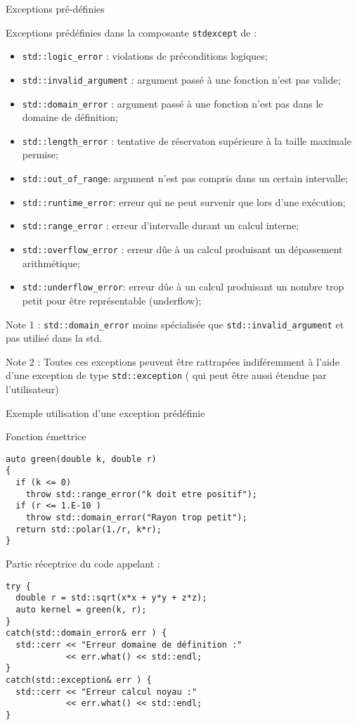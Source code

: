 \documentclass[compress,10pt,aspectratio=169]{beamer}
\begin{document}
\begin{frame}[fragile]{Exceptions pré-définies}
\scriptsize
        
  Exceptions prédéfinies dans la composante \texttt{stdexcept} de  :
  \begin{itemize}
  \item \texttt{std::logic\_error} : violations de préconditions logiques;
  \item \texttt{std::invalid\_argument} : argument passé à une fonction n'est pas valide;
  \item \texttt{std::domain\_error} : argument passé à une fonction n'est pas dans le domaine de définition;
  \item \texttt{std::length\_error} : tentative de réservaton supérieure à la taille maximale permise;
  \item \texttt{std::out\_of\_range}: argument n'est pas compris dans un certain intervalle;
  \item \texttt{std::runtime\_error}: erreur qui ne peut survenir que lors d'une exécution;
  \item \texttt{std::range\_error} : erreur d'intervalle durant un calcul interne;
  \item \texttt{std::overflow\_error} : erreur dûe à un calcul produisant un dépassement arithmétique;
  \item \texttt{std::underflow\_error}: erreur dûe à un calcul produisant un nombre trop petit pour être représentable (underflow);
  \end{itemize}
  \alert{Note 1} : \texttt{std::domain\_error} moins spécialisée que \texttt{std::invalid\_argument} et pas utilisé dans la std.
        
  \alert{Note 2} : Toutes ces exceptions peuvent être rattrapées indiféremment à l'aide d'une exception de type \texttt{std::exception} (
  qui peut être aussi étendue par l'utilisateur)
        
\end{frame}
        
\begin{frame}[fragile]{Exemple utilisation d'une exception prédéfinie}
\scriptsize
        
\begin{multicols}{2}
Fonction émettrice
\begin{verbatim}
auto green(double k, double r)
{
  if (k <= 0) 
    throw std::range_error("k doit etre positif");
  if (r <= 1.E-10 ) 
    throw std::domain_error("Rayon trop petit");
  return std::polar(1./r, k*r);
}
\end{verbatim}
\columnbreak
Partie réceptrice du code appelant :
\begin{verbatim}
try {
  double r = std::sqrt(x*x + y*y + z*z);
  auto kernel = green(k, r);
}
catch(std::domain_error& err ) {
  std::cerr << "Erreur domaine de définition :" 
            << err.what() << std::endl;
}
catch(std::exception& err ) {
  std::cerr << "Erreur calcul noyau :" 
            << err.what() << std::endl;
}
\end{verbatim}
\end{multicols}
\end{frame}
\end{document}
